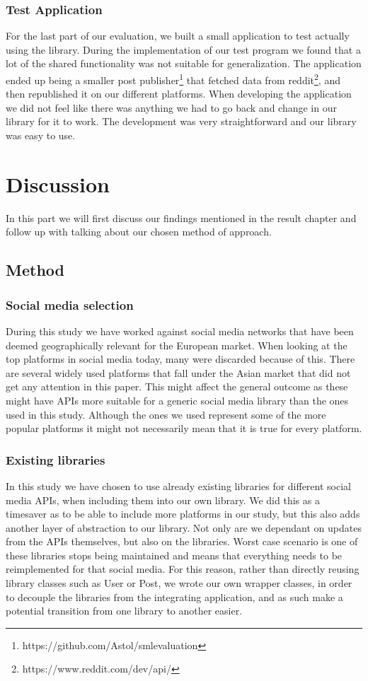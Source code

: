 \documentclass{sigchi-alternate}
\begin{document}
\subsubsection{Test Application}
For the last part of our evaluation, we built a small application to test actually using the library. During the implementation of our test program we found that a lot of the shared functionality was not suitable for generalization. The 
application ended up being a smaller post publisher\footnote{https://github.com/Astol/smlevaluation} that fetched data from reddit\footnote{https://www.reddit.com/dev/api/}, and then republished it on our different platforms. When developing
the application we did not feel like there was anything we had to go back and change in our library for it to work. The development was very straightforward and our library was easy to use.

\section{Discussion}
In this part we will first discuss our findings mentioned in the result chapter and follow up with talking about our chosen method of approach.

\subsection{Method}
\subsubsection{Social media selection}
During this study we have worked against social media networks that have been deemed geographically relevant for the European market. When looking at the top platforms in social media today\autocite{STATISTA_LEADING_SOCIAL_NETWORKS}, many were discarded
because of this. There are several widely used platforms that fall under the Asian market that did not get any attention in this paper. This might affect the general outcome as these might have APIs more suitable for a generic social media library
than the ones used in this study. Although the ones we used represent some of the more popular platforms it might not necessarily mean that it is true for every platform.

\subsubsection{Existing libraries}
In this study we have chosen to use already existing libraries for different social media APIs, when including them into our own library. We did this as a timesaver as to be able to include more platforms in our study, but this also adds another layer of
abstraction to our library. Not only are we dependant on updates from the APIs themselves, but also on the libraries. Worst case scenario is one of these libraries stops being maintained and means that everything needs to be reimplemented for that social
media. For this reason, rather than directly reusing library classes such as User or Post, we wrote our own wrapper classes, in order to decouple the libraries from the integrating application, and as such make a potential transition from one library to
another easier.
\end{document}
